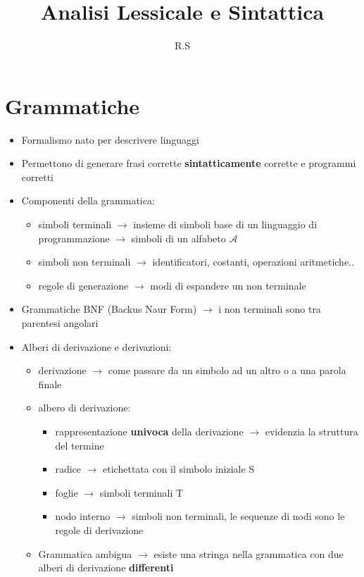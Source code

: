 \documentclass[12pt]{extarticle}
\title{Analisi Lessicale e Sintattica}
\author{R.S}
\begin{document}
\maketitle

\section*{Grammatiche}

\begin{itemize}
  \item Formalismo nato per descrivere linguaggi
  \item Permettono di generare frasi corrette \textbf{sintatticamente} corrette e programmi corretti
  \item Componenti della grammatica:
  \begin{itemize}
    \item simboli terminali $\rightarrow$ insieme di simboli base di un linguaggio di programmazione $\rightarrow$ simboli di un alfabeto $\mathcal{A}$ 
    \item simboli non terminali $\rightarrow$ identificatori, costanti, operazioni aritmetiche..
    \item regole di generazione $\rightarrow$ modi di espandere un non terminale
  \end{itemize}
  \item Grammatiche BNF (Backus Naur Form) $\rightarrow$ i non terminali sono tra parentesi angolari
  \item Alberi di derivazione e derivazioni:
  \begin{itemize}
    \item derivazione $\rightarrow$ come passare da un simbolo ad un altro o a una parola finale
    \item albero di derivazione:
    \begin{itemize}
      \item rappresentazione \textbf{univoca} della derivazione $\rightarrow$ evidenzia la struttura del termine
      \item radice $\rightarrow$ etichettata con il simbolo iniziale S
      \item foglie $\rightarrow$ simboli terminali T
      \item nodo interno $\rightarrow$ simboli non terminali, le sequenze di nodi sono le regole di derivazione 
    \end{itemize}
  \item Grammatica ambigua $\rightarrow$ esiste una stringa nella grammatica con due alberi di derivazione \textbf{differenti}

\end{itemize}
\end{itemize}
\end{document}
